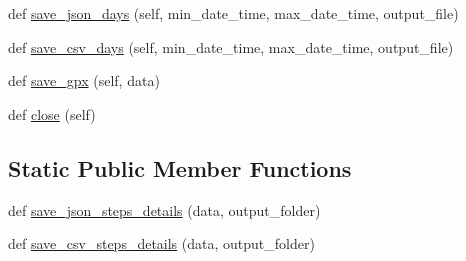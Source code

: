 \begin{DoxyCompactItemize}
\item 
def \hyperlink{classpygce_1_1models_1_1bot_1_1_garmin_connect_bot_a6b7760e4013e2ada06bed1a5f47133f1}{save\+\_\+json\+\_\+days} (self, min\+\_\+date\+\_\+time, max\+\_\+date\+\_\+time, output\+\_\+file)
\item 
def \hyperlink{classpygce_1_1models_1_1bot_1_1_garmin_connect_bot_ac10284acc765724afd060381ace0cb5e}{save\+\_\+csv\+\_\+days} (self, min\+\_\+date\+\_\+time, max\+\_\+date\+\_\+time, output\+\_\+file)
\item 
def \hyperlink{classpygce_1_1models_1_1bot_1_1_garmin_connect_bot_a9cd831d6a4a8efdd793a395f99fc1796}{save\+\_\+gpx} (self, data)
\item 
def \hyperlink{classpygce_1_1models_1_1bot_1_1_garmin_connect_bot_a969efb76eef02df4458492d68e92e231}{close} (self)
\end{DoxyCompactItemize}
\subsection*{Static Public Member Functions}
\begin{DoxyCompactItemize}
\item 
def \hyperlink{classpygce_1_1models_1_1bot_1_1_garmin_connect_bot_a987255466b3bb8f3f130376d2e07aa38}{save\+\_\+json\+\_\+steps\+\_\+details} (data, output\+\_\+folder)
\item 
def \hyperlink{classpygce_1_1models_1_1bot_1_1_garmin_connect_bot_a7a3affbcf44b0b4a2d82a3dc517d41bc}{save\+\_\+csv\+\_\+steps\+\_\+details} (data, output\+\_\+folder)
\end{DoxyCompactItemize}
